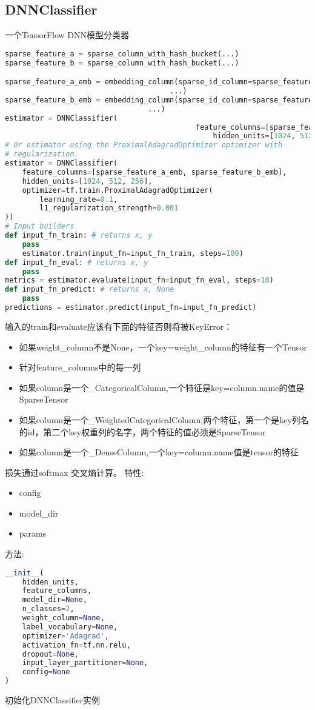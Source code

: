 \subsection{DNNClassifier}
一个TensorFlow DNN模型分类器
\begin{lstlisting}[language=Python]
sparse_feature_a = sparse_column_with_hash_bucket(...)
sparse_feature_b = sparse_column_with_hash_bucket(...)

sparse_feature_a_emb = embedding_column(sparse_id_column=sparse_feature_a,
                                      ...)
sparse_feature_b_emb = embedding_column(sparse_id_column=sparse_feature_b,
                                 ...)
estimator = DNNClassifier(
										    feature_columns=[sparse_feature_a_emb, sparse_feature_b_emb],
										        hidden_units=[1024, 512, 256])
# Or estimator using the ProximalAdagradOptimizer optimizer with
# regularization.
estimator = DNNClassifier(
    feature_columns=[sparse_feature_a_emb, sparse_feature_b_emb],
    hidden_units=[1024, 512, 256],
    optimizer=tf.train.ProximalAdagradOptimizer(
        learning_rate=0.1,
        l1_regularization_strength=0.001
))
# Input builders
def input_fn_train: # returns x, y
    pass
    estimator.train(input_fn=input_fn_train, steps=100)
def input_fn_eval: # returns x, y
    pass
metrics = estimator.evaluate(input_fn=input_fn_eval, steps=10)
def input_fn_predict: # returns x, None
    pass
predictions = estimator.predict(input_fn=input_fn_predict)
\end{lstlisting}
输入的train和evaluate应该有下面的特征否则将被KeyError：
\begin{itemize}
	\item 如果weight\_column不是None，一个key=weight\_column的特征有一个Tensor
	\item 针对feature\_columns中的每一列
	\item 如果column是一个\_CategoricalColumn,一个特征是key=column.name的值是SparseTensor
	\item 如果column是一个\_WeightedCategoricalColumn,两个特征，第一个是key列名的id，第二个key权重列的名字，两个特征的值必须是SparseTensor
	\item 如果column是一个\_DenseColumn,一个key=column.name值是tensor的特征
\end{itemize}
损失通过softmax 交叉熵计算。
特性:
\begin{itemize}
	\item config
	\item model\_dir
	\item params
\end{itemize}
方法:
\begin{lstlisting}[language=Python]
__init__(
    hidden_units,
    feature_columns,
    model_dir=None,
    n_classes=2,
    weight_column=None,
    label_vocabulary=None,
    optimizer='Adagrad',
    activation_fn=tf.nn.relu,
    dropout=None,
    input_layer_partitioner=None,
    config=None
)
\end{lstlisting}
初始化DNNClassifier实例

